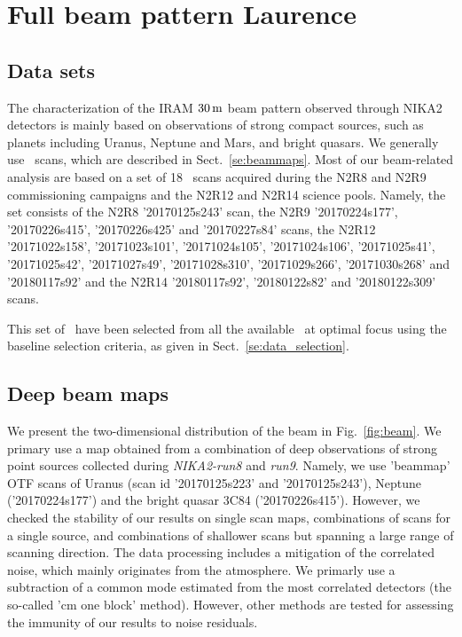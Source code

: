 \section{Full beam pattern {\color{blue} Laurence}}
\label{se:fullbeam}

\subsection{Data sets}
\label{se:beammap_set}

The characterization of the IRAM $30\,\rm{m}$ beam pattern observed
through NIKA2 detectors is mainly based on observations of strong
compact sources, such as planets including Uranus, Neptune and Mars,
and bright quasars. We generally use \bm\ scans, which are described
in Sect.~\ref{se:beammaps}.
Most of our beam-related analysis are based on a
set of 18 \bm\ scans acquired during the N2R8 and N2R9 commissioning
campaigns and the N2R12 and N2R14 science pools. Namely, the set
consists of the N2R8 '20170125s243' scan, the N2R9 '20170224s177',
'20170226s415', '20170226s425' and '20170227s84' scans, the N2R12
'20171022s158', '20171023s101', '20171024s105', '20171024s106',
'20171025s41', '20171025s42',  '20171027s49',  '20171028s310',
'20171029s266', '20171030s268' and  '20180117s92' and the N2R14
'20180117s92',  '20180122s82' and  '20180122s309' scans.

This set of \bm\ have been selected from all the available \bm\ at
optimal focus using the baseline selection criteria, as given in
Sect.~\ref{se:data_selection}.



\subsection{Deep beam maps}
\label{se:deep_beam_maps}
We present the two-dimensional distribution of the beam in
Fig.~\ref{fig:beam}. We primary use a map obtained from a combination
of deep observations of strong point sources collected during
\emph{NIKA2-run8} and \emph{run9}. Namely, we use 'beammap' OTF scans
of Uranus (scan id '20170125s223' and '20170125s243'),  Neptune
('20170224s177') and the bright quasar 3C84 ('20170226s415'). However,
we checked the stability of our results on single scan maps,
combinations of scans for a single source, and combinations of
shallower scans but spanning a large range of scanning direction. The
data processing includes a mitigation of the correlated noise, which
mainly originates from the atmosphere.  We primarly use a subtraction
of a common mode estimated from the most correlated detectors (the
so-called 'cm one block' method). However, other methods are tested
for assessing the immunity of our results to noise residuals.

